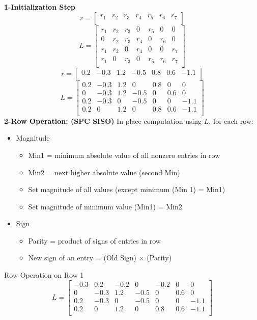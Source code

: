 \textbf{1-Initialization Step}
\[ r= \left[\begin{matrix}r_1&r_2&r_3&r_4&r_5&r_6&r_7\\\end{matrix}\right] \]
\[ L=\left[\begin{matrix}r_1&r_2&r_3&0&r_5&0&0\\0&r_2&r_3&r_4&0&r_6&0\\r_1&r_2&0&r_4&0&0&r_7\\r_1&0&r_3&0&r_5&r_6&r_7\\\end{matrix}\right] \]
\[ r= \left[\begin{matrix}0.2&-0.3&1.2&-0.5&0.8&0.6&-1.1\\\end{matrix}\right] \]
\[ L=\left[\begin{matrix}0.2&-0.3&1.2&0&0.8&0&0\\0&-0.3&1.2&-0.5&0&0.6&0\\0.2&-0.3&0&-0.5&0&0&-1.1\\0.2&0&1.2&0&0.8&0.6&-1.1\\\end{matrix}\right] \]
\textbf{2-Row Operation: (SPC SISO)}
In-place computation using $L$, for each row:
\begin{itemize}
    \item Magnitude
    \begin{itemize}
        \item Min1 = minimum absolute value of all nonzero entries in row
        \item Min2 = next higher absolute value (second Min)
        \item Set magnitude of all values (except minimum (Min 1) = Min1)
        \item Set magnitude of minimum value (Min1) = Min2
    \end{itemize}
    \item Sign
    \begin{itemize}
        \item Parity = product of signs of entries in row
        \item New sign of an entry = (Old Sign) $\times$ (Parity)
    \end{itemize}
\end{itemize}
Row Operation on Row 1
\[ L=\left[\begin{matrix}-0.3&0.2&-0.2&0&-0.2&0&0\\0&-0.3&1.2&-0.5&0&0.6&0\\0.2&-0.3&0&-0.5&0&0&-1.1\\0.2&0&1.2&0&0.8&0.6&-1.1\\\end{matrix}\right] \]
